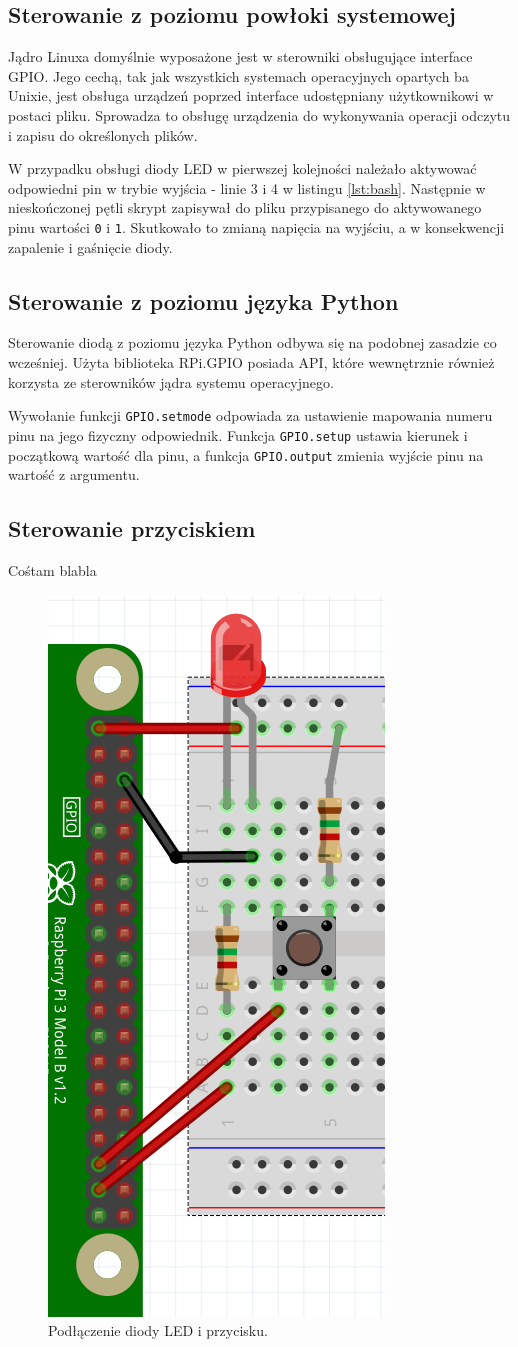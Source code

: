 \documentclass[12pt]{article}
\begin{document}
\subsection{Sterowanie z poziomu powłoki systemowej}
Jądro Linuxa domyślnie wyposażone jest w sterowniki obsługujące interface GPIO. Jego cechą, tak jak wszystkich systemach operacyjnych opartych ba Unixie, jest obsługa urządzeń poprzed interface udostępniany użytkownikowi w postaci pliku. Sprowadza to obsługę urządzenia do wykonywania operacji odczytu i zapisu do określonych plików.

W przypadku obsługi diody LED w pierwszej kolejności należało aktywować odpowiedni pin w trybie wyjścia - linie 3 i 4 w listingu \ref{lst:bash}. Następnie w nieskończonej pętli skrypt zapisywał do pliku przypisanego do aktywowanego pinu wartości \lstinline{0} i \lstinline{1}. Skutkowało to zmianą napięcia na wyjściu, a w konsekwencji zapalenie i gaśnięcie diody.


\subsection{Sterowanie z poziomu języka Python}
Sterowanie diodą z poziomu języka Python odbywa się na podobnej zasadzie co wcześniej. Użyta biblioteka RPi.GPIO posiada API, które wewnętrznie również korzysta ze sterowników jądra systemu operacyjnego. 


Wywołanie funkcji \lstinline{GPIO.setmode} odpowiada za ustawienie mapowania numeru pinu na jego fizyczny odpowiednik. Funkcja \lstinline{GPIO.setup} ustawia kierunek i początkową wartość dla pinu, a funkcja \lstinline{GPIO.output} zmienia wyjście pinu na wartość z argumentu.
\newpage
\subsection{Sterowanie przyciskiem}
Cośtam blabla
\begin{figure}[h]
  \centering
  \includegraphics[height=0.4\linewidth]{sch2}
  \caption{Podłączenie diody LED i przycisku.}
  \label{sch:1}
\end{figure}
\end{document}
